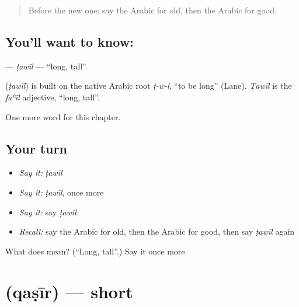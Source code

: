 \label{lesson:AR-C82-tawil}



\begin{quote}
Before the new one: say the Arabic for old, then the Arabic for good.
\end{quote}

\subsection*{You'll want to know: }
\textbf{} — \emph{ṭawīl} — \textquotedblleft{}long, tall\textquotedblright{}.

\begin{cousinweb}
\textbf{} (\emph{ṭawīl}) is built on the native Arabic root \emph{ṭ-w-l}, \textquotedblleft{}to be long\textquotedblright{} (Lane). \emph{Ṭawīl} is the \emph{faʿīl} adjective, \textquotedblleft{}long, tall\textquotedblright{}.
\end{cousinweb}

\begin{grammarlens}[title={What you've built}]
One more word for this chapter.
\end{grammarlens}

\subsection*{Your turn}
\begin{itemize}
\raggedright
  \item \emph{Say it:} \emph{ṭawīl}
  \item \emph{Say it:} \emph{ṭawīl}, once more
  \item \emph{Say it:} say \emph{ṭawīl}
  \item \emph{Recall:} say the Arabic for old, then the Arabic for good, then say \emph{ṭawīl} again
\end{itemize}

\begin{tcolorbox}[breakable,colback=teal!4,colframe=teal!35!black,title={Before you move on}]
What does  mean? (\textquotedblleft{}Long, tall\textquotedblright{}.) Say it once more.
\end{tcolorbox}
\section[\texorpdfstring{\ar{قصير} (qaṣīr)}{قصير (qaṣīr)}]{ (qaṣīr) — short}

\label{lesson:AR-C82-qasir}



